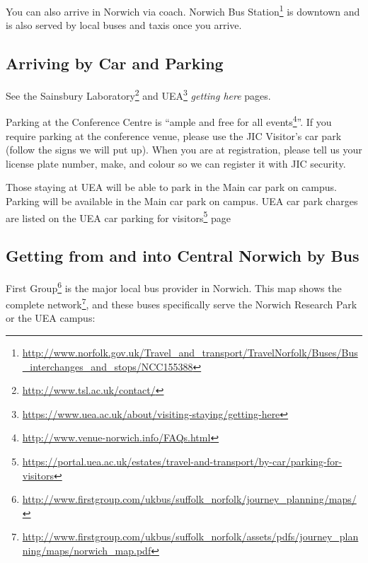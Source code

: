 \documentclass[12pt,]{book}
\let\rmarkdownfootnote\footnote%
\def\footnote{\protect\rmarkdownfootnote}
\renewcommand{\href}[2]{#2\footnote{\url{#1}}}
\theoremstyle{definition}
\theoremstyle{definition}
\theoremstyle{remark}
\begin{document}
You can also arrive in Norwich via coach.
\href{http://www.norfolk.gov.uk/Travel_and_transport/TravelNorfolk/Buses/Bus_interchanges_and_stops/NCC155388}{Norwich
Bus Station} is downtown and is also served by local buses and taxis
once you arrive.

\subsection*{Arriving by Car and
Parking}\label{arriving-by-car-and-parking}

See the \href{http://www.tsl.ac.uk/contact/}{Sainsbury Laboratory} and
\href{https://www.uea.ac.uk/about/visiting-staying/getting-here}{UEA}
\emph{getting here} pages.

Parking at the Conference Centre is
``\href{http://www.venue-norwich.info/FAQs.html}{ample and free for all
events}''. If you require parking at the conference venue, please use
the JIC Visitor's car park (follow the signs we will put up). When you
are at registration, please tell us your license plate number, make, and
colour so we can register it with JIC security.

Those staying at UEA will be able to park in the Main car park on
campus. Parking will be available in the Main car park on campus. UEA
car park charges are listed on the
\href{https://portal.uea.ac.uk/estates/travel-and-transport/by-car/parking-for-visitors}{UEA
car parking for visitors} page

\subsection*{Getting from and into Central Norwich by
Bus}\label{getting-from-and-into-central-norwich-by-bus}

\href{http://www.firstgroup.com/ukbus/suffolk_norfolk/journey_planning/maps/}{First
Group} is the major local bus provider in Norwich.
\href{http://www.firstgroup.com/ukbus/suffolk_norfolk/assets/pdfs/journey_planning/maps/norwich_map.pdf}{This
map shows the complete network}, and these buses specifically serve the
Norwich Research Park or the UEA campus:
\end{document}
